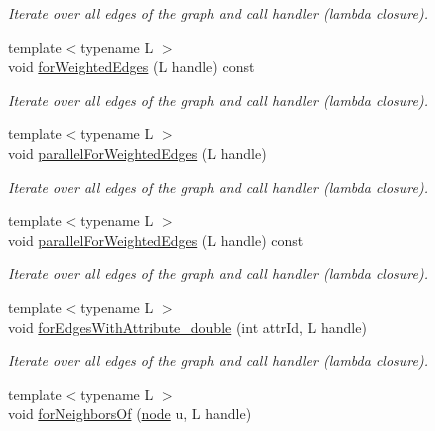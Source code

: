 \begin{DoxyCompactItemize}
\begin{DoxyCompactList}\small\item\em Iterate over all edges of the graph and call handler (lambda closure). \end{DoxyCompactList}\item 
{\footnotesize template$<$typename L $>$ }\\void \hyperlink{class_ensemble_clustering_1_1_graph_a9a5faf549a4698d905d5807dec49f5f5}{for\-Weighted\-Edges} (L handle) const 
\begin{DoxyCompactList}\small\item\em Iterate over all edges of the graph and call handler (lambda closure). \end{DoxyCompactList}\item 
{\footnotesize template$<$typename L $>$ }\\void \hyperlink{class_ensemble_clustering_1_1_graph_aeb7b4827ad45d77896a5692fc0a3f26a}{parallel\-For\-Weighted\-Edges} (L handle)
\begin{DoxyCompactList}\small\item\em Iterate over all edges of the graph and call handler (lambda closure). \end{DoxyCompactList}\item 
{\footnotesize template$<$typename L $>$ }\\void \hyperlink{class_ensemble_clustering_1_1_graph_ac8f97453be9f7071744ef01e340fc4ba}{parallel\-For\-Weighted\-Edges} (L handle) const 
\begin{DoxyCompactList}\small\item\em Iterate over all edges of the graph and call handler (lambda closure). \end{DoxyCompactList}\item 
{\footnotesize template$<$typename L $>$ }\\void \hyperlink{class_ensemble_clustering_1_1_graph_ad7b649197b08695937862c337af4376d}{for\-Edges\-With\-Attribute\-\_\-double} (int attr\-Id, L handle)
\begin{DoxyCompactList}\small\item\em Iterate over all edges of the graph and call handler (lambda closure). \end{DoxyCompactList}\item 
{\footnotesize template$<$typename L $>$ }\\void \hyperlink{class_ensemble_clustering_1_1_graph_a4d1024eccff37ffb085025959d7e6ae3}{for\-Neighbors\-Of} (\hyperlink{namespace_ensemble_clustering_ae829290aeccd1a420b17a37fd901f114}{node} u, L handle)

\end{DoxyCompactItemize}

